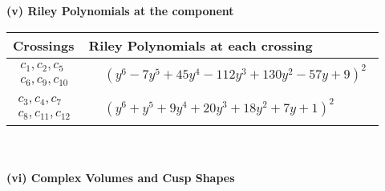 \documentclass[1p]{elsarticle_modified}
\theoremstyle{definition}
\begin{document}
\newpage\renewcommand{\arraystretch}{1}
\flushleft \textbf{(v) Riley Polynomials at the component}\newline \\
\begin{tabular}{m{50pt}|m{274pt}}
Crossings & \hspace{64pt}Riley Polynomials at each crossing \\
\hline $$\begin{aligned}c_{1},c_{2},c_{5}\\c_{6},c_{9},c_{10}\end{aligned}$$&$\begin{aligned}
&(y^6-7 y^5+45 y^4-112 y^3+130 y^2-57 y+9)^2
\end{aligned}$\\
\hline $$\begin{aligned}c_{3},c_{4},c_{7}\\c_{8},c_{11},c_{12}\end{aligned}$$&$\begin{aligned}
&(y^6+y^5+9 y^4+20 y^3+18 y^2+7 y+1)^2
\end{aligned}$\\
\hline
\end{tabular}\\~\\
\newpage\flushleft \textbf{(vi) Complex Volumes and Cusp Shapes}
\end{document}
